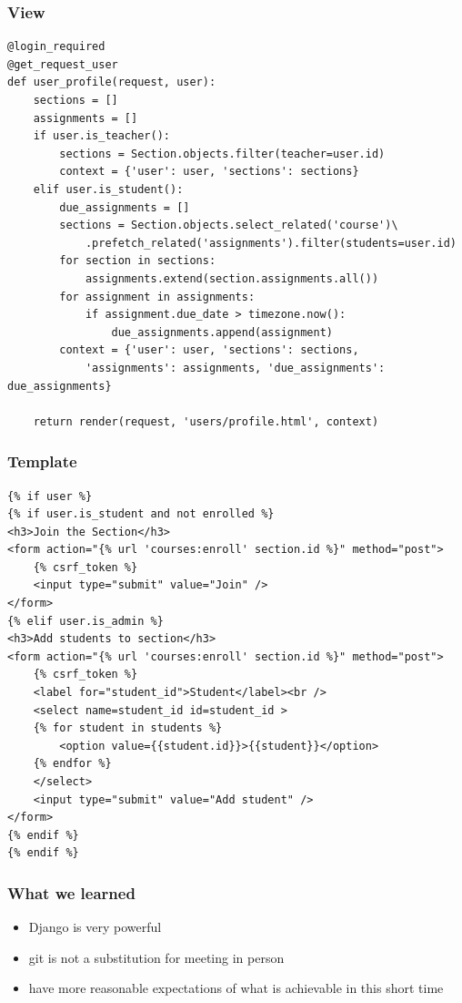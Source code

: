 \documentclass{beamer}
\begin{document}
\begin{frame}[fragile]
\frametitle{View}

\begin{lstlisting}[basicstyle=\tiny]
@login_required
@get_request_user
def user_profile(request, user):
    sections = []
    assignments = []
    if user.is_teacher():
        sections = Section.objects.filter(teacher=user.id)
        context = {'user': user, 'sections': sections}
    elif user.is_student():
        due_assignments = []
        sections = Section.objects.select_related('course')\
            .prefetch_related('assignments').filter(students=user.id)
        for section in sections:
            assignments.extend(section.assignments.all())
        for assignment in assignments:
            if assignment.due_date > timezone.now():
                due_assignments.append(assignment)
        context = {'user': user, 'sections': sections, 
            'assignments': assignments, 'due_assignments': due_assignments}

    return render(request, 'users/profile.html', context)  
\end{lstlisting}
\end{frame}




\begin{frame}[fragile]
\frametitle{Template}

\begin{lstlisting}[basicstyle=\tiny]
{% if user %}
{% if user.is_student and not enrolled %}
<h3>Join the Section</h3>
<form action="{% url 'courses:enroll' section.id %}" method="post">
    {% csrf_token %}
    <input type="submit" value="Join" />
</form>
{% elif user.is_admin %}
<h3>Add students to section</h3>
<form action="{% url 'courses:enroll' section.id %}" method="post">
    {% csrf_token %}
    <label for="student_id">Student</label><br />
    <select name=student_id id=student_id >
    {% for student in students %}
        <option value={{student.id}}>{{student}}</option>
    {% endfor %}
    </select>
    <input type="submit" value="Add student" />
</form>
{% endif %}
{% endif %}  
\end{lstlisting}
\end{frame}


\begin{frame}[fragile]
\frametitle{What we learned}

\begin{itemize}
	\item Django is very powerful
	\item git is not a substitution for meeting in person
	\item have more reasonable expectations of what is achievable in this short time
\end{itemize}

\end{frame}
\end{document}
